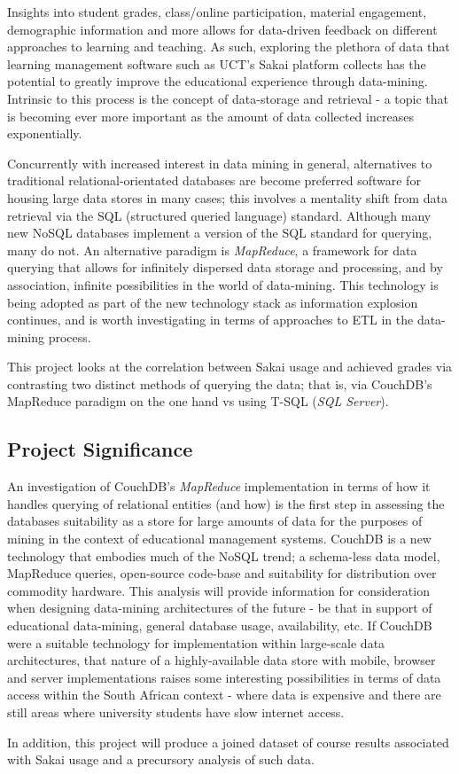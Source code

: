 Insights into student grades, class/online participation, material engagement, demographic information and more allows for data-driven feedback on different approaches to learning and teaching. As such, exploring the plethora of data that learning management software such as UCT's Sakai platform collects has the potential to greatly improve the educational experience through data-mining. Intrinsic to this process is the concept of data-storage and retrieval - a topic that is becoming ever more important as the amount of data collected increases exponentially.

Concurrently with increased interest in data mining in general, alternatives to traditional relational-orientated databases are become preferred software for housing large data stores in many cases; this involves a mentality shift from data retrieval via the SQL (structured queried language) standard. Although many new NoSQL databases implement a version of the SQL standard for querying, many do not. An alternative paradigm is \textit{MapReduce}, a framework for data querying that allows for infinitely dispersed data storage and processing, and by association, infinite possibilities in the world of data-mining. This technology is being adopted as part of the new technology stack as information explosion continues, and is worth investigating in terms of approaches to ETL in the data-mining process.

This project looks at the correlation between Sakai usage and achieved grades via contrasting two distinct methods of querying the data; that is, via CouchDB's MapReduce paradigm on the one hand vs using T-SQL (\textit{SQL Server}).

\subsection{Project Significance}
An investigation of CouchDB's \textit{MapReduce} implementation in terms of how it handles querying of relational entities (and how) is the first step in assessing the databases suitability as a store for large amounts of data for the purposes of mining in the context of educational management systems. CouchDB is a new technology that embodies much of the NoSQL trend; a schema-less data model, MapReduce queries, open-source code-base and suitability for distribution over commodity hardware. This analysis will provide information for consideration when designing data-mining architectures of the future - be that in support of educational data-mining, general database usage, availability, etc. If CouchDB were a suitable technology for implementation within large-scale data architectures, that nature of a highly-available data store with mobile, browser and server implementations raises some interesting possibilities in terms of data access within the South African context - where data is expensive and there are still areas where university students have slow internet access.

In addition, this project will produce a joined dataset of course results associated with Sakai usage and a precursory analysis of such data.